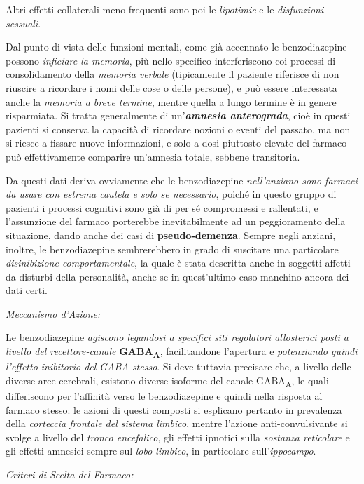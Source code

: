\begin{itemize}
Altri effetti collaterali meno frequenti sono poi le \emph{lipotimie} e
le \emph{disfunzioni sessuali}.

Dal punto di vista delle funzioni mentali, come già accennato le
benzodiazepine possono \emph{inficiare la memoria}, più nello specifico
interferiscono coi processi di consolidamento della \emph{memoria
verbale} (tipicamente il paziente riferisce di non riuscire a ricordare
i nomi delle cose o delle persone), e può essere interessata anche la
\emph{memoria a breve termine}, mentre quella a lungo termine è in
genere risparmiata. Si tratta generalmente di un'\textbf{\emph{amnesia
anterograda}}, cioè in questi pazienti si conserva la capacità di
ricordare nozioni o eventi del passato, ma non si riesce a fissare nuove
informazioni, e solo a dosi piuttosto elevate del farmaco può
effettivamente comparire un'amnesia totale, sebbene transitoria.

Da questi dati deriva ovviamente che le benzodiazepine
\emph{nell'anziano sono farmaci da usare con estrema cautela e solo se
necessario}, poiché in questo gruppo di pazienti i processi cognitivi
sono già di per sé compromessi e rallentati, e l'assunzione del farmaco
porterebbe inevitabilmente ad un peggioramento della situazione, dando
anche dei casi di \textbf{pseudo-demenza}. Sempre negli anziani,
inoltre, le benzodiazepine sembrerebbero in grado di suscitare una
particolare \emph{disinibizione comportamentale}, la quale è stata
descritta anche in soggetti affetti da disturbi della personalità, anche
se in quest'ultimo caso manchino ancora dei dati certi.

\emph{\emph{Meccanismo d'Azione:}}

Le benzodiazepine \emph{agiscono legandosi a specifici siti regolatori
allosterici posti a livello del recettore-canale}
\textbf{GABA\textsubscript{A}}, facilitandone l'apertura e
\emph{potenziando quindi l'effetto inibitorio del GABA stesso}. Si deve
tuttavia precisare che, a livello delle diverse aree cerebrali, esistono
diverse isoforme del canale GABA\textsubscript{A}, le quali differiscono
per l'affinità verso le benzodiazepine e quindi nella risposta al
farmaco stesso: le azioni di questi composti si esplicano pertanto in
prevalenza della \emph{corteccia frontale del sistema limbico}, mentre
l'azione anti-convulsivante si svolge a livello del \emph{tronco
encefalico}, gli effetti ipnotici sulla \emph{sostanza reticolare} e gli
effetti amnesici sempre sul \emph{lobo limbico}, in particolare
sull'\emph{ippocampo}.

\emph{\emph{Criteri di Scelta del Farmaco:}}


\end{itemize}
